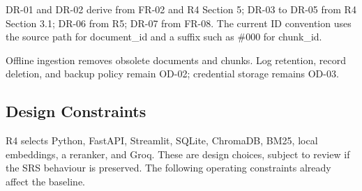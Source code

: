 \documentclass[11pt,letterpaper]{article}
\begin{document}
\endgroup

DR-01 and DR-02 derive from FR-02 and R4 Section 5; DR-03 to DR-05 from R4 Section 3.1; DR-06 from R5; DR-07 from FR-08. The current ID convention uses the source path for document\_id and a suffix such as \#000 for chunk\_id.\par

Offline ingestion removes obsolete documents and chunks. Log retention, record deletion, and backup policy remain OD-02; credential storage remains OD-03.\par

\subsection{Design Constraints}

R4 selects Python, FastAPI, Streamlit, SQLite, ChromaDB, BM25, local embeddings, a reranker, and Groq. These are design choices, subject to review if the SRS behaviour is preserved. The following operating constraints already affect the baseline.\par

\begingroup\small
\end{document}

